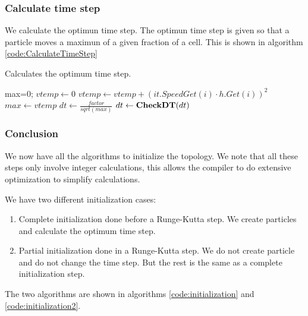 \subsubsection{Calculate time step}

We calculate the optimun time step.
The optimun time step is given so that a particle moves a maximun of a given fraction of a cell.
This is shown in algorithm \ref{code:CalculateTimeStep}
\begin{algorithm}
\caption{Calculates the optimum time step.}
\label{code:CalculateTimeStep}
\begin{algorithmic}[1]
max=0;
				\State $vtemp\gets 0$
					\State $vtemp\gets vtemp+(it.SpeedGet(i)\cdot h.Get(i))^2$
				\EndFor
					\State $max \gets vtemp$
				\EndIf
			\EndIf
	\EndFor
        \State $dt \gets \frac{factor}{sqrt(max)}$ 
	\State $dt \gets \mathop{\textbf{CheckDT}}(dt)$ 
\EndProcedure
\end{algorithmic}
\end{algorithm}

\subsubsection{Conclusion}

We now have all the algorithms to initialize the topology.
We note that all these steps only involve integer calculations, this allows the compiler to do extensive optimization
to simplify calculations.

We have two different initialization cases:
\begin{enumerate}
 \item Complete initialization done before a Runge-Kutta step. We create particles and calculate the optimum time step.
 \item Partial initialization done in a Runge-Kutta step. We do not create particle and do not change the time step.
 But the rest is the same as a complete initialization step.
\end{enumerate}
The two algorithms are shown in algorithms \ref{code:initialization} and \ref{code:initialization2}.

